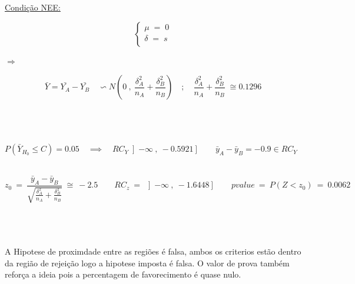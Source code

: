 \\
\\
\hspace*{5cm} \underline{Condição NEE:}\\
\begin{minipage}[l]{0pt}
$$\left\lbrace\begin{array}{c}
\mu \;=\; 0 \\
\delta \;=\; s \\
\end{array}\right.$$
\end{minipage}
\hspace{3cm} $\Longrightarrow$ \hspace{1cm}
\begin{minipage}[l]{0pt}
\[ \bar{Y}=\bar{Y_A}-\bar{Y_B} \quad \backsim N \left( 0\:,\: \frac{\delta_A^2}{n_A}+\frac{\delta_B^2}{n_B} \right) \quad ; \quad \frac{\delta_A^2}{n_A}+\frac{\delta_B^2}{n_B} \; \cong 0.1296 \]
\end{minipage}\\
\\
\\
$P(\bar{Y}_{H_0} \leqslant C)=0.05 \quad \implies \quad RC_Y\left] -\infty \:,\: -0.5921 \right] \qquad \bar{y}_A-\bar{y}_B=-0.9 \in RC_Y $ \\
\\
\begin{minipage}[l]{0pt}
\[  z_0\:=\: \frac{\bar{y}_A-\bar{y}_B}{\sqrt{\frac{\delta_A^2}{n_A}+\frac{\delta_B^2}{n_B}}}\:\cong\: -2.5 \qquad
	RC_z \:=\: \left] -\infty \:,\: -1.6448 \right]  \qquad
	pvalue \:=\: P(Z<z_0) \:=\: 0.0062 \]
\end{minipage}\\
\\
\\
A Hipotese de proximdade entre as regiões é falsa, ambos os criterios estão dentro da região de rejeição logo a hipotese imposta é falsa.
O valor de prova também reforça a ideia pois a percentagem de favorecimento é quase nulo.\\
\\
\newpage
